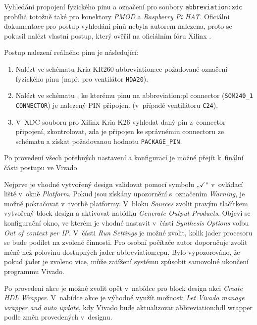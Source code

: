 \documentclass[a4paper, twoside, 11pt]{article}
\newcommand{\fbar}{\FloatBarrier}
\begin{document}
				Vyhledání propojení fyzického pinu a označení pro soubory \texttt{\gls{abbreviation:xdc}} probíhá totožně také pro konektory \textit{PMOD} a \textit{Raspberry Pi HAT}. Oficiální dokumentace pro postup vyhledání pinů nebyla autorem nalezena, proto se pokusil nalézt vlastní postup, který ověřil na oficiálním fóru Xilinx \cite{xilinx-support-forum-petrzakopal-schematic-vs-constrains-pin-confusion-explanation}.\par
				\vspace*{0.55cm}
				Postup nalezení reálného pinu je následující:
				\begin{enumerate}
					\item Nalézt ve schématu \cite{kria-kr260-starter-kit-cc-schematics} Kria KR260 \gls{abbreviation:cc} požadované označení fyzického pinu (např. pro ventilátor \texttt{HDA20}).
					\item Nalézt ve schématu \cite{kria-kr260-starter-kit-cc-schematics}, ke kterému pinu na \gls{abbreviation:pl} connector (\texttt{SOM240\_1 CONNECTOR}) je nalezený PIN připojen. (v~případě ventilátoru \texttt{C24}).
					\item V~XDC \cite{kria-k26-som-xdc} souboru pro Xilinx Kria K26 vyhledat daný pin z~connector připojení, zkontrolovat, zda je připojen ke správnémiu connectoru ze schématu a získat požadovanou hodnotu \texttt{PACKAGE\_PIN}.
				\end{enumerate}
				\vspace*{0.75cm}
				\fbar
				Po provedení všech pořebných nastavení a konfigurací je možné přejít k~finální části postupu ve Vivado.\par
				Nejprve je vhodné vytvořený design validovat pomocí symbolu „$\checkmark$“ v~ovládací liště v~okně \textit{Platform}. Pokud jsou získány upozornění s~označením \textit{Warning}, je možné pokračovat v~tvorbě platformy. V~bloku \textit{Sources} zvolit pravým tlačítkem vytvořený block design a aktivovat nabídku \textit{Generate Output Products}. Objeví se konfigurační okno, ve kterém je vhodné nastavit v~části \textit{Synthesis Options} volbu \textit{Out of context per IP}. V~části \textit{Run Settings} je možné zvolit, kolik jader procesoru se bude podílet na zvolené činnosti. Pro osobní počítače autor doporučuje zvolit méně než polovinu dostupných jader \gls{abbreviation:cpu}. Bylo vypozorováno, že pokud jader je zvoleno více, může zatížení systému způsobit samovolné ukončení programmu Vivado.\par
				Po provedení akce je možné zvolit opět v~nabídce pro block design akci \textit{Create HDL Wrapper}. V~nabídce akce je výhodné využít možnosti \textit{Let Vivado manage wrapper and auto update}, kdy Vivado bude aktualizovar \gls{abbreviation:hdl} wrapper podle změn provedených v~designu.\par
\end{document}
